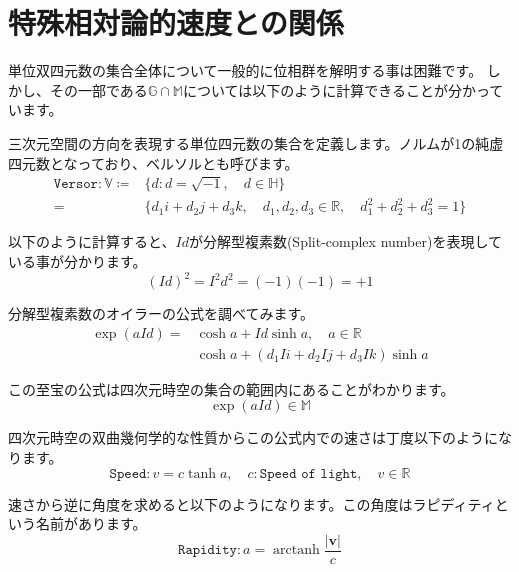\documentclass[a4paper,12pt,notitlepage]{jsreport}
\DeclareMathOperator\arctanh{arctanh}
\begin{document}
\section{特殊相対論的速度との関係}

単位双四元数の集合全体について一般的に位相群を解明する事は困難です。
しかし、その一部である$\mathbb{G}\cap\mathbb{M}$については以下のように計算できることが分かっています。

三次元空間の方向を表現する単位四元数の集合を定義します。ノルムが1の純虚四元数となっており、ベルソルとも呼びます。
\begin{equation}
  \begin{split}
    \texttt{Versor}:\mathbb{V}\coloneq&\{d:d=\sqrt{-1},\quad d\in\mathbb{H}\}\\
    =&\{d_1i+d_2j+d_3k,\quad d_1,d_2,d_3\in\mathbb{R},\quad d_1^2+d_2^2+d_3^2=1\}
  \end{split}
\end{equation}

以下のように計算すると、$Id$が分解型複素数(Split-complex number)を表現している事が分かります。
\begin{equation}
  (Id)^2=I^2d^2=(-1)(-1)=+1
\end{equation}

分解型複素数のオイラーの公式を調べてみます。
\begin{equation}
  \begin{split}
    \exp(aId)=&\cosh a+Id\sinh a,\quad a\in\mathbb{R}\\
    &\cosh a+(d_1Ii+d_2Ij+d_3Ik)\sinh a
  \end{split}
\end{equation}

この至宝の公式は四次元時空の集合の範囲内にあることがわかります。
\begin{equation}
  \exp(aId)\in\mathbb{M}
\end{equation}

四次元時空の双曲幾何学的な性質からこの公式内での速さは丁度以下のようになります。
\begin{equation}
  \texttt{Speed}:v=c\tanh a,\quad c:\texttt{Speed of light},\quad v\in\mathbb{R}
\end{equation}

速さから逆に角度を求めると以下のようになります。この角度はラピディティという名前があります。
\begin{equation}
  \texttt{Rapidity}:a=\arctanh\frac{|\bm{v}|}{c}
\end{equation}
\end{document}
